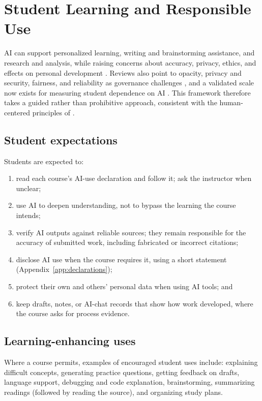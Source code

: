 \section{Student Learning and Responsible Use}\label{sec:student}

AI can support personalized learning, writing and brainstorming assistance, and research and analysis, while raising concerns about accuracy, privacy, ethics, and effects on personal development \citep{chanhu2023}. Reviews also point to opacity, privacy and security, fairness, and reliability as governance challenges \citep{yu2023}, and a validated scale now exists for measuring student dependence on AI \citep{moralesgarcia2024}. This framework therefore takes a guided rather than prohibitive approach, consistent with the human-centered principles of \cmo{}.

\subsection{Student expectations}
Students are expected to:
\begin{enumerate}
  \item read each course's AI-use declaration and follow it; ask the instructor when unclear;
  \item use AI to deepen understanding, not to bypass the learning the course intends;
  \item verify AI outputs against reliable sources; they remain responsible for the accuracy of submitted work, including fabricated or incorrect citations;
  \item disclose AI use when the course requires it, using a short statement (Appendix~\ref{app:declarations});
  \item protect their own and others' personal data when using AI tools; and
  \item keep drafts, notes, or AI-chat records that show how work developed, where the course asks for process evidence.
\end{enumerate}

\subsection{Learning-enhancing uses}
Where a course permits, examples of encouraged student uses include: explaining difficult concepts, generating practice questions, getting feedback on drafts, language support, debugging and code explanation, brainstorming, summarizing readings (followed by reading the source), and organizing study plans.

